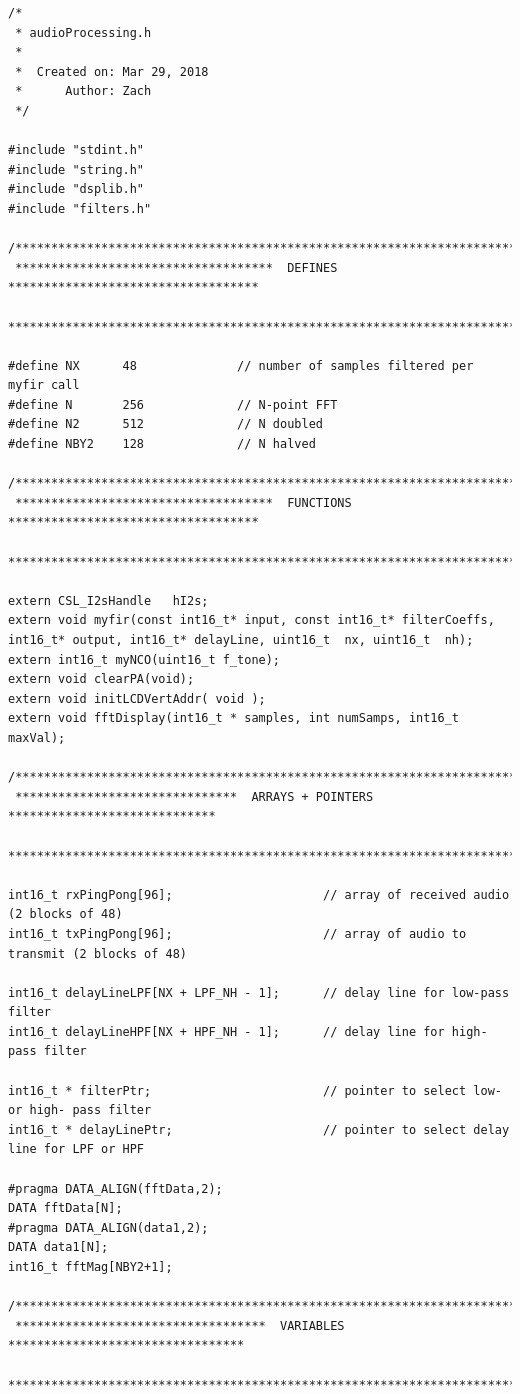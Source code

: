\documentclass[11pt,pdftex,portrait,letterpaper]{article}
\begin{document}
\begin{lstlisting}[caption={audioProcessing.h}, label=l:program2]
/*
 * audioProcessing.h
 *
 *  Created on: Mar 29, 2018
 *      Author: Zach
 */

#include "stdint.h"
#include "string.h"
#include "dsplib.h"
#include "filters.h"

/**********************************************************************************
 ************************************  DEFINES  ***********************************
 **********************************************************************************/

#define NX		48				// number of samples filtered per myfir call
#define N		256				// N-point FFT
#define N2		512				// N doubled
#define NBY2	128				// N halved

/************************************************************************************
 ************************************  FUNCTIONS  ***********************************
 ************************************************************************************/

extern CSL_I2sHandle   hI2s;
extern void myfir(const int16_t* input, const int16_t* filterCoeffs, int16_t* output, int16_t* delayLine, uint16_t  nx, uint16_t  nh);
extern int16_t myNCO(uint16_t f_tone);
extern void clearPA(void);
extern void initLCDVertAddr( void );
extern void fftDisplay(int16_t * samples, int numSamps, int16_t maxVal);

/*********************************************************************************
 *******************************  ARRAYS + POINTERS  *****************************
 *********************************************************************************/

int16_t rxPingPong[96];						// array of received audio (2 blocks of 48)
int16_t txPingPong[96];						// array of audio to transmit (2 blocks of 48)

int16_t delayLineLPF[NX + LPF_NH - 1];		// delay line for low-pass filter
int16_t delayLineHPF[NX + HPF_NH - 1];		// delay line for high-pass filter

int16_t * filterPtr;						// pointer to select low- or high- pass filter
int16_t * delayLinePtr;						// pointer to select delay line for LPF or HPF

#pragma DATA_ALIGN(fftData,2);
DATA fftData[N];
#pragma DATA_ALIGN(data1,2);
DATA data1[N];
int16_t fftMag[NBY2+1];

/*********************************************************************************
 ***********************************  VARIABLES  *********************************
 *********************************************************************************/


\end{lstlisting}
\end{document}
